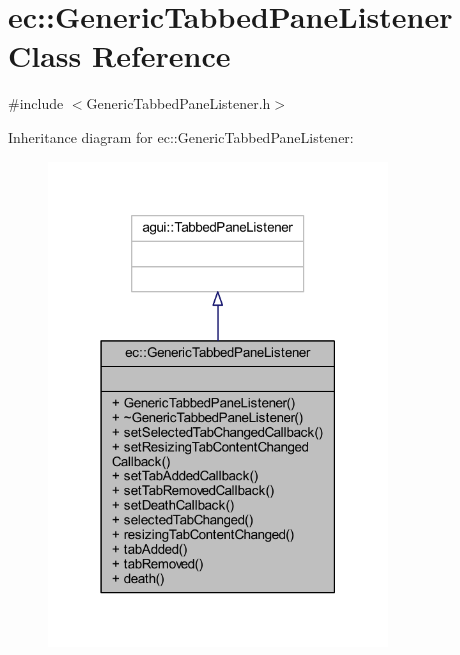 \hypertarget{classec_1_1_generic_tabbed_pane_listener}{}\section{ec\+:\+:Generic\+Tabbed\+Pane\+Listener Class Reference}
\label{classec_1_1_generic_tabbed_pane_listener}


{\ttfamily \#include $<$Generic\+Tabbed\+Pane\+Listener.\+h$>$}



Inheritance diagram for ec\+:\+:Generic\+Tabbed\+Pane\+Listener\+:\nopagebreak
\begin{figure}[H]
\begin{center}
\leavevmode
\includegraphics[width=255pt]{classec_1_1_generic_tabbed_pane_listener__inherit__graph}
\end{center}
\end{figure}


